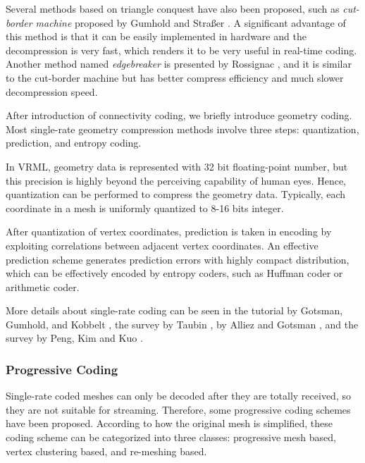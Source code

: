 \documentclass[11pt, a4paper]{report}
\begin{document}
    Several methods based on triangle conquest have also been
    proposed, such as \emph{cut-border machine} proposed by 
    Gumhold and Stra\ss{}er \cite{280836}.
    A significant advantage of this method is that it can be easily implemented
    in hardware and the decompression is very fast, which
    renders it to be very useful in real-time coding. 
    Another method named \emph{edgebreaker} is presented by Rossignac \cite{614421},
    and it is similar to the cut-border machine but has better
    compress efficiency and much slower decompression speed.
    
    After introduction of connectivity coding, we briefly introduce geometry
    coding. Most single-rate geometry compression methods involve three steps:
    quantization, prediction, and entropy coding.

    In VRML, geometry data is represented with 32 bit floating-point
    number, but this precision is highly beyond the perceiving
    capability of human eyes. Hence, quantization can be performed to
    compress the geometry data. Typically, each coordinate in a mesh is
    uniformly quantized to 8-16 bits integer.

    After quantization of vertex coordinates, prediction is taken in
    encoding by exploiting correlations between adjacent vertex
    coordinates. An effective prediction scheme generates prediction
    errors with highly compact distribution, which can be effectively
    encoded by entropy coders, such as Huffman coder or arithmetic
    coder. 

    More details about single-rate coding can be seen in the tutorial
    by Gotsman, Gumhold, and Kobbelt \cite{gotsman-simplification},
    the survey by Taubin \cite{3d:Taubin}, by Alliez and Gotsman
    \cite{recent:alliez}, and the survey by Peng, Kim and Kuo
    \cite{technologies:peng}.
    
    \subsubsection{Progressive Coding}
    Single-rate coded meshes can only be decoded after they are
    totally received, so they are not suitable for streaming. Therefore,
    some progressive coding schemes have been proposed. According to
    how the original mesh is simplified, these coding scheme can be
    categorized into three classes: progressive mesh based, vertex
    clustering based, and re-meshing based.
    
\end{document}
